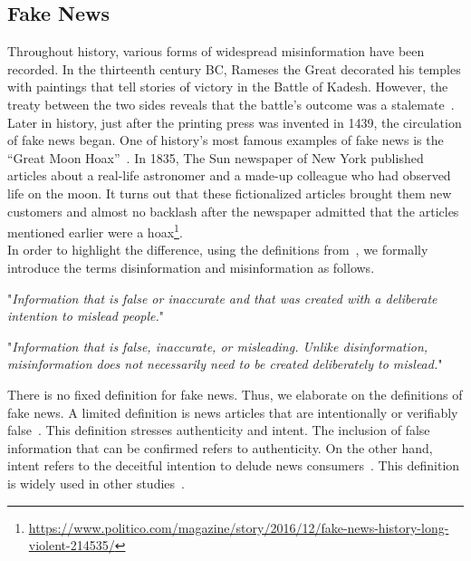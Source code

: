 \subsection{Fake News}
\label{subsec:fakeNewsDetection_fakeNews}
Throughout history, various forms of widespread misinformation have been recorded. In the thirteenth
century BC, Rameses the Great decorated his temples with paintings that tell stories of victory in the Battle
of Kadesh. However, the treaty between the two sides reveals that the battle's outcome was a stalemate~\parencite{HistorysGreatestLies_Weir}. Later in history, just after the printing press was invented in 1439, the circulation of fake news began. One of history's most famous examples of fake news is the “Great Moon Hoax”~\parencite{TheGreatMoonHoax_Foster}. In 1835, The Sun newspaper of New York published articles about a real-life astronomer and a made-up colleague who had observed life on the moon. It turns out that these fictionalized articles brought them new customers and almost no backlash after the newspaper admitted that the articles mentioned earlier were a hoax\footnote{\url{https://www.politico.com/magazine/story/2016/12/fake-news-history-long-violent-214535/}}.\\
In order to highlight the difference, using the definitions from~\parencite{ThePsycologyOfFakeNews_Pennycook}, we formally introduce the terms disinformation and misinformation as follows.
\begin{definition}
    "\emph{Information that is false or inaccurate and that was created with a deliberate intention to mislead people.}"~\parencite{ThePsycologyOfFakeNews_Pennycook}
\end{definition}
\begin{definition}
    "\emph{Information that is false, inaccurate, or misleading. Unlike disinformation, misinformation does not necessarily need to be created deliberately to mislead.}"~\parencite{ThePsycologyOfFakeNews_Pennycook}
\end{definition}
There is no fixed definition for fake news. Thus, we elaborate on the definitions of fake news. A limited definition is news articles that are intentionally or verifiably false~\parencite{SocialMediaAndFakeNewsIn2016Election_Allcott}. This definition stresses authenticity and intent. The inclusion of false information that can be confirmed refers to authenticity. On the other hand, intent refers to the deceitful intention to delude news consumers~\parencite{FakeNewsDetectionOnSocialMediaADataMiningPerspective_Shu}. This definition is widely used in other studies~\parencite{AutomaticDeceptionDetection_Conroy, TheFakeNewsSpreadingPlague_Mustafaraj, FakeNewsDetectionOnSocialMediaADataMiningPerspective_Shu}.\\
